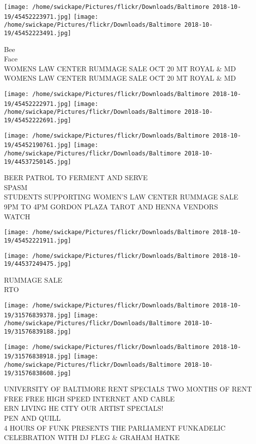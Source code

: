 \documentclass[10pt,letterpaper]{article}
\begin{document}
\texttt{[image: /home/swickape/Pictures/flickr/Downloads/Baltimore 2018-10-19/45452223971.jpg]}
\texttt{[image: /home/swickape/Pictures/flickr/Downloads/Baltimore 2018-10-19/45452223491.jpg]}

Bee\\
Face\\
WOMENS LAW CENTER RUMMAGE SALE OCT 20 MT ROYAL \& MD\\
WOMENS LAW CENTER RUMMAGE SALE OCT 20 MT ROYAL \& MD\\
\pagebreak

\texttt{[image: /home/swickape/Pictures/flickr/Downloads/Baltimore 2018-10-19/45452222971.jpg]}
\texttt{[image: /home/swickape/Pictures/flickr/Downloads/Baltimore 2018-10-19/45452222691.jpg]}

\texttt{[image: /home/swickape/Pictures/flickr/Downloads/Baltimore 2018-10-19/45452190761.jpg]}
\texttt{[image: /home/swickape/Pictures/flickr/Downloads/Baltimore 2018-10-19/44537250145.jpg]}

BEER PATROL TO FERMENT AND SERVE\\
SPASM\\
STUDENTS SUPPORTING WOMEN'S LAW CENTER RUMMAGE SALE 9PM TO 4PM GORDON PLAZA TAROT AND HENNA VENDORS\\
WATCH\\
\pagebreak

\texttt{[image: /home/swickape/Pictures/flickr/Downloads/Baltimore 2018-10-19/45452221911.jpg]}

\vspace{0.25in}
\texttt{[image: /home/swickape/Pictures/flickr/Downloads/Baltimore 2018-10-19/44537249475.jpg]}

RUMMAGE SALE\\
RTO\\
\pagebreak

\texttt{[image: /home/swickape/Pictures/flickr/Downloads/Baltimore 2018-10-19/31576839378.jpg]}
\texttt{[image: /home/swickape/Pictures/flickr/Downloads/Baltimore 2018-10-19/31576839188.jpg]}

\texttt{[image: /home/swickape/Pictures/flickr/Downloads/Baltimore 2018-10-19/31576838918.jpg]}
\texttt{[image: /home/swickape/Pictures/flickr/Downloads/Baltimore 2018-10-19/31576838608.jpg]}

UNIVERSITY OF BALTIMORE RENT SPECIALS TWO MONTHS OF RENT FREE FREE HIGH SPEED INTERNET AND CABLE\\
ERN LIVING HE CITY OUR ARTIST SPECIALS!\\
PEN AND QUILL\\
4 HOURS OF FUNK PRESENTS THE PARLIAMENT FUNKADELIC CELEBRATION WITH DJ FLEG \& GRAHAM HATKE\\
\pagebreak
\end{document}
